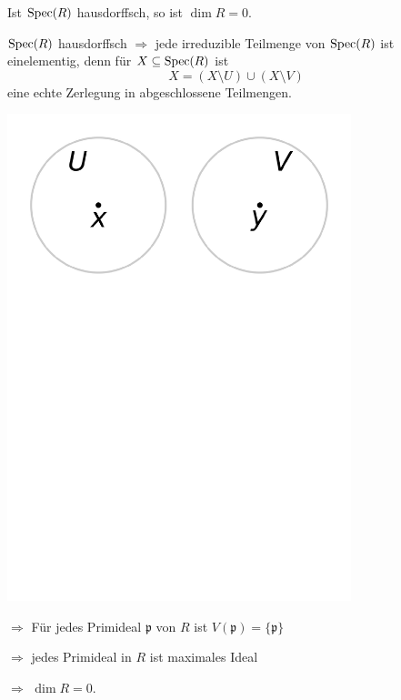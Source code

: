 \documentclass[a4paper, 10pt]{report}
\begin{document}
\begin{Folg}
Ist $\mathrm{Spec}(R)$ hausdorffsch, so ist $\dim R = 0$.

\begin{Bew}
$\mathrm{Spec}(R)$ hausdorffsch $\Rightarrow$ jede irreduzible Teilmenge von
$\mathrm{Spec}(R)$ ist einelementig, denn für $X\subseteq\mathrm{Spec}(R)$ ist
\[
X=(X\setminus U)\cup(X\setminus V)
\]
eine echte Zerlegung in abgeschlossene
Teilmengen.

\begin{center}
	\includegraphics[width=0.75\textwidth]{images/algebra2/hausdorff.pdf}
\end{center}

$\Rightarrow$ F\"ur jedes Primideal $\mathfrak{p}$ von $R$ ist $V(\mathfrak{p}) = \{ \mathfrak{p} \}$

$\Rightarrow$ jedes Primideal in $R$ ist maximales Ideal

$\Rightarrow$ $\dim R = 0$.

\end{Bew}

\end{Folg}
\end{document}
